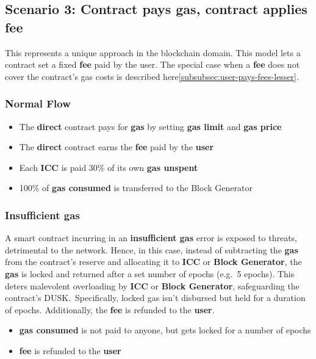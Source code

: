 \documentclass[twocolumn, nofootinbib]{revtex4-2}
\begin{document}
    \subsection{Scenario 3: Contract pays gas, contract applies fee}\label{subsec:scenario-3}
    This represents a unique approach in the blockchain domain.
    This model lets a contract set a fixed \textbf{fee} paid by the user.
    The special case when a \textbf{fee} does not cover the contract's gas costs
    is described here\ref{subsubsec:user-pays-fees-lesser}.

    \subsubsection{Normal Flow}\label{subsubsec:normal-flow-3}
    \begin{itemize}
        \item The \textbf{direct} contract pays for \textbf{gas} by setting
              \textbf{gas limit} and \textbf{gas price}
        \item The \textbf{direct} contract earns the \textbf{fee} paid by the \textbf{user}
        \item Each \textbf{ICC} is paid 30\% of its own \textbf{gas unspent}
        \item 100\% of \textbf{gas consumed} is transferred to the Block Generator
    \end{itemize}

    \subsubsection{Insufficient gas}\label{subsubsec:insufficient-gas-3}
    A smart contract incurring in an \textbf{insufficient gas} error is exposed
    to threats, detrimental to the network.
    Hence, in this case, instead of subtracting the \textbf{gas} from the
    contract's reserve and allocating it to \textbf{ICC} or
    \textbf{Block Generator}, the \textbf{gas} is locked and returned after a
    set number of epochs (e.g.\ 5 epochs).
    This deters malevolent overloading by \textbf{ICC} or
    \textbf{Block Generator}, safeguarding the contract's DUSK.\
    Specifically, locked gas isn't disbursed but held for a duration of epochs.
    Additionally, the \textbf{fee} is refunded to the \textbf{user}.

    \begin{itemize}
        \item \textbf{gas consumed} is not paid to anyone, but gets locked for
              a number of epochs
        \item \textbf{fee} is refunded to the \textbf{user}
    \end{itemize}
\end{document}

